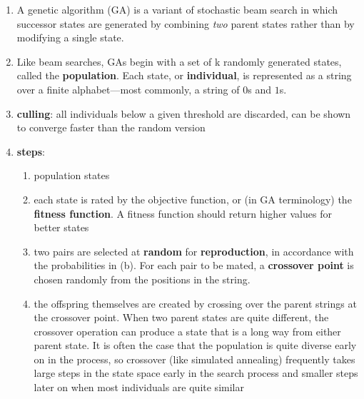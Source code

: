 \begin{enumerate}
    \item A genetic algorithm (GA) is a variant of stochastic beam search in which successor states are generated by combining \textit{two} parent states rather than by modifying a single state.
    \hfill \cite{ai/book/Artificial-Intelligence-A-Modern-Approach/Russell-Norvig}

    \item Like beam searches, GAs begin with a set of k randomly generated states, called the \textbf{population}. 
    Each state, or \textbf{individual}, is represented as a string over a finite alphabet—most commonly, a string of $0$s and $1$s.
    \hfill \cite{ai/book/Artificial-Intelligence-A-Modern-Approach/Russell-Norvig}

    \item \textbf{culling}: all individuals below a given threshold are discarded, can be shown to converge faster than the random version
    \hfill \cite{ai/book/Artificial-Intelligence-A-Modern-Approach/Russell-Norvig}

    \item \textbf{steps}:
    \begin{enumerate}
        \item population states
        \hfill \cite{ai/book/Artificial-Intelligence-A-Modern-Approach/Russell-Norvig}

        \item each state is rated by the objective function, or (in GA terminology) the \textbf{fitness function}.
        A fitness function should return higher values for better states
        \hfill \cite{ai/book/Artificial-Intelligence-A-Modern-Approach/Russell-Norvig}

        \item two pairs are selected at \textbf{random} for \textbf{reproduction}, in accordance with the probabilities in (b).
        For each pair to be mated, a \textbf{crossover point} is chosen randomly from the positions in the string.
        \hfill \cite{ai/book/Artificial-Intelligence-A-Modern-Approach/Russell-Norvig}

        \item the offspring themselves are created by crossing over the parent strings at the crossover point.
        When two parent states are quite different, the crossover operation can produce a state that is a long way from either parent state. 
        It is often the case that the population is quite diverse early on in the process, so crossover (like simulated annealing) frequently takes large steps in the state space early in the search process and smaller steps later on when most individuals are quite similar
        \hfill \cite{ai/book/Artificial-Intelligence-A-Modern-Approach/Russell-Norvig}


\end{enumerate}
\end{enumerate}
